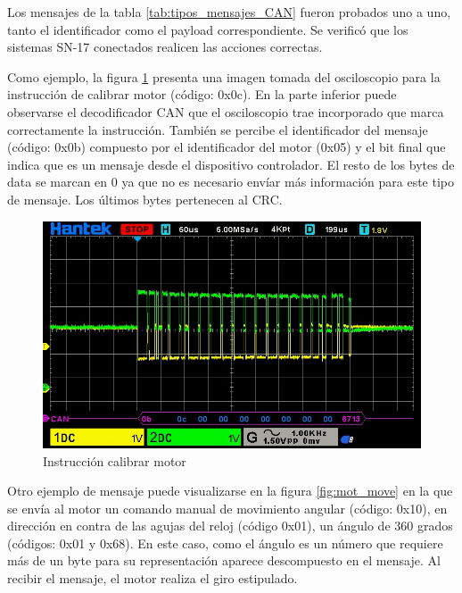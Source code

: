 Los mensajes de la tabla \ref{tab:tipos_mensajes_CAN} fueron probados uno a uno, tanto el identificador como el payload correspondiente. Se verificó que los sistemas SN-17 conectados realicen las acciones correctas.

Como ejemplo, la figura \ref{fig:mot_calib} presenta una imagen tomada del osciloscopio para la instrucción de calibrar motor (código: 0x0c). En la parte inferior puede observarse el decodificador CAN que el osciloscopio trae incorporado que marca correctamente la instrucción. También se percibe el identificador del mensaje (código: 0x0b) compuesto por el identificador del motor (0x05) y el bit final que indica que es un mensaje desde el dispositivo controlador. El resto de los bytes de data se marcan en 0 ya que no es necesario envíar más información para este tipo de mensaje. Los últimos bytes pertenecen al CRC.

\begin{figure}[htbp]
	\centering
	\includegraphics[scale=0.6]{./Figures/Motor_Calibrate.jpg}
	\caption{Instrucción calibrar motor}
	\label{fig:mot_calib}
\end{figure}

Otro ejemplo de mensaje puede visualizarse en la figura \ref{fig:mot_move} en la que se envía al motor un comando manual de movimiento angular (código: 0x10), en dirección en contra de las agujas del reloj (código 0x01), un ángulo de 360 grados (códigos: 0x01 y 0x68). En este caso, como el ángulo es un número que requiere más de un byte para su representación aparece descompuesto en el mensaje. Al recibir el mensaje, el motor realiza el giro estipulado.

